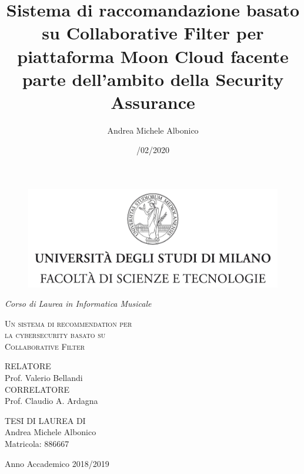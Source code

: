 \documentclass[12pt,fleqn,twoside,a4paper]{book}
\title{Sistema di raccomandazione basato su Collaborative Filter per piattaforma Moon Cloud 
facente parte dell'ambito della Security Assurance}
\author{Andrea Michele Albonico}
\date{/02/2020}
\begin{document}
\frontmatter

\begin{titlepage}
    \begin{center}
        \begin{figure}
            \centering
            \includegraphics[height=5.0 cm]{logo.jpg}
        \end{figure}
        \vspace{.2 cm}
        {\Large
            \emph{Corso di Laurea in Informatica Musicale}
        }
        \vfill
        \begin{LARGE}
            \textsc{Un sistema di recommendation per\\[-0.2 cm]
            la cybersecurity basato su\\[.2 cm]
            Collaborative Filter}
        \end{LARGE}
        \vfill
        \begin{flushleft}
            {\large
                RELATORE\\[.3 cm] Prof. Valerio Bellandi\\[1 cm]
                \noindent CORRELATORE\\[.3 cm] Prof. Claudio A. Ardagna
            }
        \end{flushleft}
        \vfill
        \begin{flushright}
            {\large TESI DI LAUREA DI\\[.3cm] Andrea Michele Albonico\\[.15cm] Matricola: 886667}
        \end{flushright}
        \vfill
        {\Large Anno Accademico 2018/2019}
    \end{center}
\end{titlepage}

\break




\end{document}
